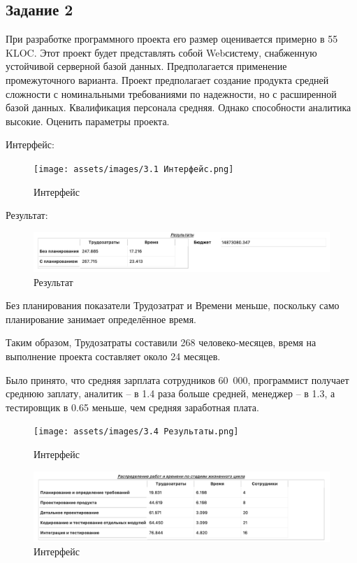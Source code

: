 \subsection{Задание 2}

При разработке программного проекта его размер оценивается примерно в 55 KLOC. Этот проект будет представлять собой Webсистему, снабженную устойчивой серверной базой данных. Предполагается применение промежуточного варианта. Проект предполагает создание продукта средней сложности с номинальными требованиями по надежности, но с расширенной базой данных. Квалификация персонала средняя. Однако способности аналитика высокие. Оценить параметры проекта.

Интерфейс:

\begin{figure}[ht!]
	\texttt{[image: assets/images/3.1 Интерфейс.png]}
	\caption{Интерфейс}
\end{figure}
\FloatBarrier

Результат:

\begin{figure}[ht!]
	\includegraphics[width=0.75\linewidth]{assets/images/3.2 Результат.png}
	\caption{Результат}
\end{figure}
\FloatBarrier

Без планирования показатели Трудозатрат и Времени меньше, поскольку само планирование занимает определённое время.

Таким образом, Трудозатраты составили 268 человеко-месяцев, время на выполнение проекта составляет около 24 месяцев.

Было принято, что средняя зарплата сотрудников 60 000, программист получает среднюю заплату, аналитик – в 1.4 раза больше средней, менеджер – в 1.3, а тестировщик в 0.65 меньше, чем средняя заработная плата. 

\begin{figure}[ht!]
	\texttt{[image: assets/images/3.4 Результаты.png]}
	\caption{Интерфейс}
\end{figure}
\FloatBarrier

\begin{figure}[ht!]
	\includegraphics[width=0.75\linewidth]{assets/images/3.5 Результаты.png}
	\caption{Интерфейс}
\end{figure}
\FloatBarrier

